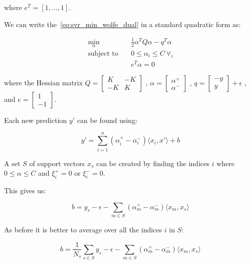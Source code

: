 where $e^T = [1, \dots, 1]$.

We can write the~\eqref{eq:svr_min_wolfe_dual} in a standard quadratic form as:

\begin{equation}
    \begin{aligned} \label{eq:svr_min_qp_wolfe_dual}
        \min_{\alpha} \quad & \frac{1}{2}\alpha^T Q\alpha-q^T\alpha \\
            \text{subject to} \quad & 0\leq\alpha_i\leq C \ \forall_i \\ & e^T\alpha=0
    \end{aligned}
\end{equation}

where the Hessian matrix $Q =
\begin{bmatrix}
K & -K\\
-K & K 
\end{bmatrix}$
, $\alpha = 
\begin{bmatrix}
\alpha^+\\
\alpha^-
\end{bmatrix}$
, $q =
\begin{bmatrix}
-y\\
y
\end{bmatrix} + \epsilon$
, and $e =
\begin{bmatrix}
1\\
-1
\end{bmatrix}$.

Each new prediction $y'$ can be found using:

\begin{equation} \label{eq:svr_pred}
    y'= \sum_{i=1}^n (\alpha_i^+ - \alpha_i^-)\langle x_i, x' \rangle+b
\end{equation}

A set $S$ of support vectors $x_s$ can be created by finding the indices $i$ where $0\leq\alpha\leq C$ and $\xi_i^+=0$ or $\xi_i^-=0$.

This gives us:

\begin{equation} \label{eq:svr_b}
    b=y_s-\epsilon-\sum_{m\in S}(\alpha_m^+ -\alpha_m^-) \langle x_m, x_s \rangle
\end{equation}

As before it is better to average over all the indices $i$ in $S$:

\begin{equation} \label{eq:svr_b_avg}
    b=\frac{1}{N_s}\sum_{s\in S}y_s-\epsilon-\sum_{m \in S}(\alpha_m^+ - \alpha_m^-)\langle x_m, x_s \rangle
\end{equation}

